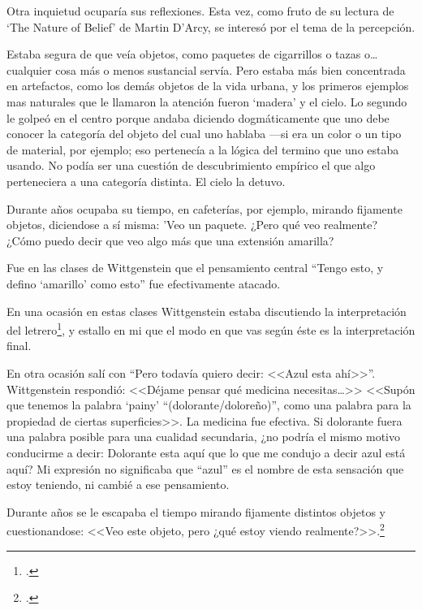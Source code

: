 Otra inquietud ocuparía sus reflexiones. Esta vez, como fruto de su lectura de
`The Nature of Belief' de Martin D'Arcy, se interesó por el tema de la
percepción. 
\begin{revision}
Estaba segura de que veía objetos, como paquetes de cigarrillos o tazas o\ldots
cualquier cosa más o menos sustancial servía. Pero estaba más bien concentrada
en artefactos, como los demás objetos de la vida urbana, y los primeros ejemplos
mas naturales que le llamaron la atención fueron `madera' y el cielo. Lo segundo
le golpeó en el centro porque andaba diciendo dogmáticamente que uno debe
conocer la categoría del objeto del cual uno hablaba ---si era un color o un tipo
de material, por ejemplo; eso pertenecía a la lógica del termino que uno estaba
usando. No podía ser una cuestión de descubrimiento empírico el que algo
perteneciera a una categoría distinta. El cielo la detuvo.

Durante años ocupaba su tiempo, en cafeterías, por ejemplo, mirando fijamente
objetos, diciendose a sí misma: 'Veo un paquete. ¿Pero qué veo realmente? ¿Cómo
puedo decir que veo algo más que una extensión amarilla?

Fue en las clases de Wittgenstein que el pensamiento central ``Tengo esto, y
defino `amarillo' como esto'' fue efectivamente atacado. 

En una ocasión en estas clases Wittgenstein estaba discutiendo la
interpretación del letrero\footcite[p.~86~\S198]{PI}, y estallo en mi que el
modo en que vas según éste es la interpretación final.

En otra ocasión salí con ``Pero todavía quiero decir: <<Azul esta ahí>>''.
Wittgenstein respondió: <<Déjame pensar qué medicina necesitas\ldots>> <<Supón
que tenemos la palabra `painy' ``(dolorante/doloreño)'', como una palabra para la
propiedad de ciertas superficies>>. La medicina fue efectiva.
Si dolorante fuera una palabra posible para una cualidad secundaria, ¿no podría
el mismo motivo conducirme a decir: Dolorante esta aquí que lo que me condujo a
decir azul está aquí? Mi expresión no significaba que ``azul'' es el nombre de
esta sensación que estoy teniendo, ni cambié a ese pensamiento. 

Durante años se le escapaba el tiempo mirando fijamente distintos
objetos y cuestionandose: <<Veo este objeto, pero ¿qué estoy viendo
realmente?>>.\footcite[cf.~][p.~viii \S1]{M&PotM}
\end{revision}


